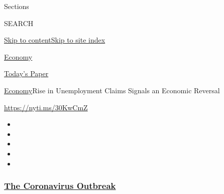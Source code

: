Sections

SEARCH

\protect\hyperlink{site-content}{Skip to
content}\protect\hyperlink{site-index}{Skip to site index}

\href{https://www.nytimes3xbfgragh.onion/section/business/economy}{Economy}

\href{https://myaccount.nytimes3xbfgragh.onion/auth/login?response_type=cookie\&client_id=vi}{}

\href{https://www.nytimes3xbfgragh.onion/section/todayspaper}{Today's
Paper}

\href{/section/business/economy}{Economy}\textbar{}Rise in Unemployment
Claims Signals an Economic Reversal

\url{https://nyti.ms/30KwCmZ}

\begin{itemize}
\item
\item
\item
\item
\item
\end{itemize}

\hypertarget{the-coronavirus-outbreak}{%
\subsubsection{\texorpdfstring{\href{https://www.nytimes3xbfgragh.onion/news-event/coronavirus?name=styln-coronavirus-markets\&region=TOP_BANNER\&block=storyline_menu_recirc\&action=click\&pgtype=Article\&impression_id=6ef304c0-f2a4-11ea-9fa3-9f633d681c3c\&variant=undefined}{The
Coronavirus
Outbreak}}{The Coronavirus Outbreak}}\label{the-coronavirus-outbreak}}

